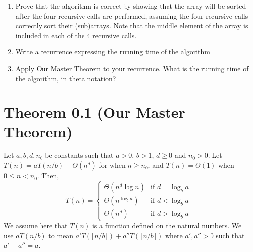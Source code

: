 \documentclass{article}
\begin{document}
\begin{enumerate}[label=(\alph*)]
    \item Prove that the algorithm is correct by showing that the array will be sorted after the four recursive calls are performed, assuming the four recursive calls correctly sort their (sub)arrays. Note that the middle element of the array is included in each of the 4 recursive calls.
    \item Write a recurrence expressing the running time of the algorithm.
    \item Apply Our Master Theorem to your recurrence. What is the running time of the algorithm, in theta notation?
\end{enumerate}


\pagebreak

\section*{Theorem 0.1 (Our Master Theorem)}
Let $a, b, d, n_0$ be constants such that $a > 0$, $b > 1$, $d \ge 0$ and $n_0 > 0$.
Let $T(n) = aT(n/b) + \Theta(n^d)$ for when $n \ge n_0$, and $T(n) = \Theta(1)$ when $0 \le n < n_0$. Then,
\[
T(n) = \begin{cases}
    \Theta(n^d \log n) & \text{if } d = \log_b a \\
    \Theta(n^{\log_b a}) & \text{if } d < \log_b a \\
    \Theta(n^d) & \text{if } d > \log_b a
\end{cases}
\]
We assume here that $T(n)$ is a function defined on the natural numbers. We use $aT(n/b)$ to mean $a'T(\lfloor n/b \rfloor) + a''T(\lceil n/b \rceil)$ where $a', a'' > 0$ such that $a' + a'' = a$.
\end{document}
